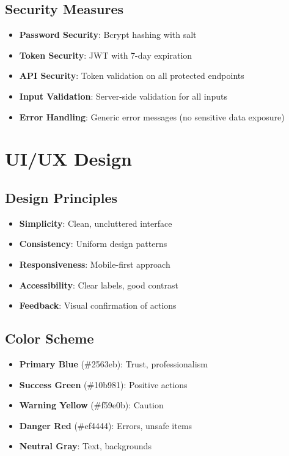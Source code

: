 \subsection{Security Measures}

\begin{itemize}
    \item \textbf{Password Security}: Bcrypt hashing with salt
    \item \textbf{Token Security}: JWT with 7-day expiration
    \item \textbf{API Security}: Token validation on all protected endpoints
    \item \textbf{Input Validation}: Server-side validation for all inputs
    \item \textbf{Error Handling}: Generic error messages (no sensitive data exposure)
\end{itemize}

\section{UI/UX Design}

\subsection{Design Principles}

\begin{itemize}
    \item \textbf{Simplicity}: Clean, uncluttered interface
    \item \textbf{Consistency}: Uniform design patterns
    \item \textbf{Responsiveness}: Mobile-first approach
    \item \textbf{Accessibility}: Clear labels, good contrast
    \item \textbf{Feedback}: Visual confirmation of actions
\end{itemize}

\subsection{Color Scheme}

\begin{itemize}
    \item \textbf{Primary Blue} (\#2563eb): Trust, professionalism
    \item \textbf{Success Green} (\#10b981): Positive actions
    \item \textbf{Warning Yellow} (\#f59e0b): Caution
    \item \textbf{Danger Red} (\#ef4444): Errors, unsafe items
    \item \textbf{Neutral Gray}: Text, backgrounds
\end{itemize}

